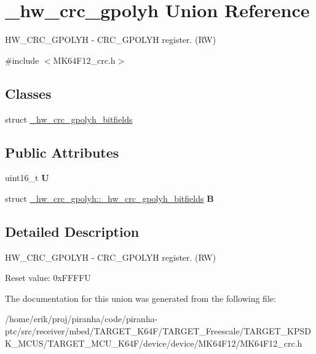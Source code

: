 \hypertarget{union__hw__crc__gpolyh}{}\section{\+\_\+hw\+\_\+crc\+\_\+gpolyh Union Reference}
\label{union__hw__crc__gpolyh}


H\+W\+\_\+\+C\+R\+C\+\_\+\+G\+P\+O\+L\+YH -\/ C\+R\+C\+\_\+\+G\+P\+O\+L\+YH register. (RW)  




{\ttfamily \#include $<$M\+K64\+F12\+\_\+crc.\+h$>$}

\subsection*{Classes}
\begin{DoxyCompactItemize}
\item 
struct \hyperlink{struct__hw__crc__gpolyh_1_1__hw__crc__gpolyh__bitfields}{\+\_\+hw\+\_\+crc\+\_\+gpolyh\+\_\+bitfields}
\end{DoxyCompactItemize}
\subsection*{Public Attributes}
\begin{DoxyCompactItemize}
\item 
uint16\+\_\+t {\bfseries U}\hypertarget{union__hw__crc__gpolyh_a41e6c9f8e6bda2a2759cb5ee19093911}{}\label{union__hw__crc__gpolyh_a41e6c9f8e6bda2a2759cb5ee19093911}

\item 
struct \hyperlink{struct__hw__crc__gpolyh_1_1__hw__crc__gpolyh__bitfields}{\+\_\+hw\+\_\+crc\+\_\+gpolyh\+::\+\_\+hw\+\_\+crc\+\_\+gpolyh\+\_\+bitfields} {\bfseries B}\hypertarget{union__hw__crc__gpolyh_a4dfbf01d81ab2b10e132203d9e2432ea}{}\label{union__hw__crc__gpolyh_a4dfbf01d81ab2b10e132203d9e2432ea}

\end{DoxyCompactItemize}


\subsection{Detailed Description}
H\+W\+\_\+\+C\+R\+C\+\_\+\+G\+P\+O\+L\+YH -\/ C\+R\+C\+\_\+\+G\+P\+O\+L\+YH register. (RW) 

Reset value\+: 0x\+F\+F\+F\+FU 

The documentation for this union was generated from the following file\+:\begin{DoxyCompactItemize}
\item 
/home/erik/proj/piranha/code/piranha-\/ptc/src/receiver/mbed/\+T\+A\+R\+G\+E\+T\+\_\+\+K64\+F/\+T\+A\+R\+G\+E\+T\+\_\+\+Freescale/\+T\+A\+R\+G\+E\+T\+\_\+\+K\+P\+S\+D\+K\+\_\+\+M\+C\+U\+S/\+T\+A\+R\+G\+E\+T\+\_\+\+M\+C\+U\+\_\+\+K64\+F/device/device/\+M\+K64\+F12/M\+K64\+F12\+\_\+crc.\+h\end{DoxyCompactItemize}
